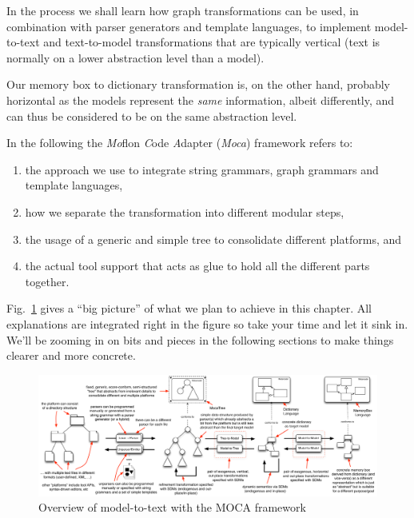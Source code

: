 In the process we shall learn how graph transformations can be used, in combination with parser generators and template languages, to implement model-to-text and text-to-model transformations that are typically vertical (text is normally on a lower abstraction level than a model).  

Our memory box to dictionary transformation is, on the other hand, probably horizontal as the models represent the \emph{same} information, albeit differently, and can thus be considered to be on the same abstraction level.

\vspace{1.5cm}


In the following the \emph{Mo}flon \emph{C}ode \emph{A}dapter (\emph{Moca}) framework refers to:
\begin{enumerate}
 \item the approach we use to integrate string grammars, graph grammars and template languages, 
 \item how we separate the transformation into different modular steps, 
 \item the usage of a generic and simple tree to consolidate different platforms, and 
 \item the actual tool support that acts as glue to hold all the different parts together.
\end{enumerate}
 
Fig.~\ref{fig:moca-overview} gives a ``big picture'' of what we plan to achieve in this chapter.
All explanations are integrated right in the figure so take your time and let it sink in.
We'll be zooming in on bits and pieces in the following sections to make things clearer and more concrete.
\begin{figure}[htp]
\begin{center}
 \includegraphics[angle=90, height=\textheight]{pics/moca/text-to-model}
  \caption{Overview of model-to-text with the MOCA framework}
  \label{fig:moca-overview}
\end{center}
\end{figure} 

\clearpage



 
 




%
 

